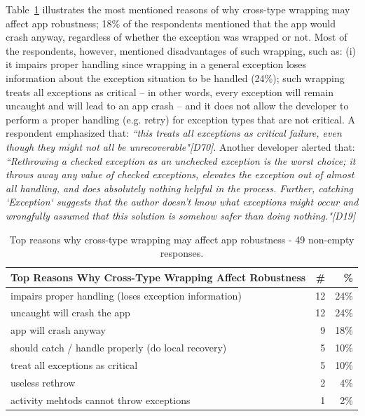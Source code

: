  Table~\ref{tab:robustness} illustrates the  most mentioned reasons of why cross-type wrapping may affect app robustness; 18\% of the respondents mentioned that the app would crash anyway, regardless of whether the exception was wrapped or not. Most of the respondents, however, mentioned disadvantages of such wrapping, such as: (i) it impairs proper handling since wrapping in a general exception loses information about the exception situation to be handled (24\%); such wrapping treats all exceptions as critical -- in other words, every exception will remain uncaught and will lead to an app crash -- and it does not allow the developer to perform a proper handling (e.g. retry) for exception types that are not critical. A respondent emphasized that: \emph{``this treats all exceptions as critical failure, even though they might not all be unrecoverable"[D70]}. Another developer alerted that: \emph{``Rethrowing a checked exception as an unchecked exception is the worst choice; it throws away any value of checked exceptions, elevates the exception out of almost all handling, and does absolutely nothing helpful in the process. Further, catching `Exception` suggests that the author doesn't know what exceptions might occur and wrongfully assumed that this solution is somehow safer than doing nothing."[D19]}		

 

\begin{table}
\scriptsize
\centering
\begin{tabular}{lrr}
\hline
\bfseries{Top Reasons Why Cross-Type Wrapping Affect Robustness} & \bfseries{\#} & \bfseries{\%} \\
\hline
impairs proper handling (loses exception information)	& 12 &	24\% \\
uncaught will crash the app	& 12 &	24\% \\
app will crash anyway	& 9	& 18\% \\
should catch / handle properly (do local recovery)	 & 5 & 	10\% \\
treat all exceptions as critical	& 5 &	10\% \\
useless rethrow	& 2 &	4\% \\
activity mehtods cannot throw exceptions &	1 &	2\% \\

\hline
\end{tabular}
\caption{Top reasons why cross-type wrapping may affect app robustness - 49 non-empty responses. }
\label{tab:robustness}
\end{table}


